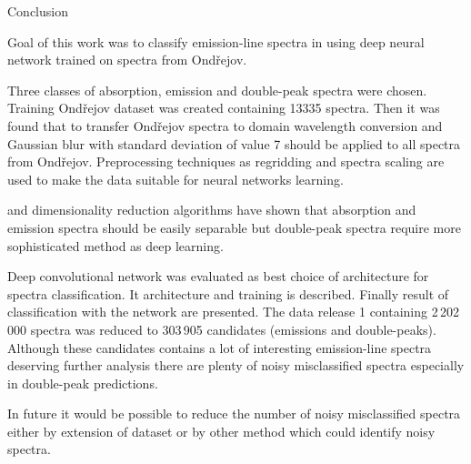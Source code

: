 \chap Conclusion

Goal of this work was to classify emission-line spectra in 
using deep neural network trained on spectra from Ondřejov.

Three classes of absorption, emission and double-peak spectra were chosen.
Training Ondřejov dataset was created containing 13335 spectra.
Then it was found that to transfer Ondřejov spectra to
 domain wavelength conversion
and Gaussian blur with standard deviation of value 7
should be applied to all spectra from Ondřejov.
Preprocessing techniques as regridding and spectra scaling are used
to make the data suitable for neural networks learning.

 and  dimensionality reduction algorithms have shown
that absorption and emission spectra should be easily separable
but double-peak spectra require more sophisticated method as deep learning.

Deep convolutional network was evaluated as best choice of architecture for
spectra classification. It architecture and training is described.
Finally result of classification with the network are presented.
The  data release 1 containing 2\,202\,000 spectra was reduced to
303\,905 candidates (emissions and double-peaks).
Although these candidates contains a lot of interesting emission-line
spectra deserving further analysis
there are plenty of noisy misclassified spectra especially in double-peak
predictions.

In future it would be possible to reduce the number of noisy misclassified
spectra either by extension of dataset
or by other method which could identify noisy spectra.

